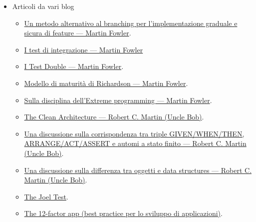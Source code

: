 \documentclass[../norme-di-progetto.tex]{subfiles}
\begin{document}
\begin{itemize}
  \item Articoli da vari blog
        \begin{itemize}
          \item \href{https://martinfowler.com/articles/feature-toggles.html}{Un metodo alternativo al branching per l'implementazione graduale e sicura di feature --- Martin Fowler}.
          \item \href{https://martinfowler.com/bliki/IntegrationTest.html}{I test di integrazione --- Martin Fowler}
          \item\href{https://martinfowler.com/articles/mocksArentStubs.html}{I Test Double --- Martin Fowler}.
          \item \href{https://martinfowler.com/articles/richardsonMaturityModel.html}{Modello di maturità di Richardson --- Martin Fowler}.
          \item \href{https://martinfowler.com/bliki/BeckDesignRules.html}{Sulla disciplina dell'Extreme programming --- Martin Fowler}.
          \item \href{https://blog.cleancoder.com/uncle-bob/2012/08/13/the-clean-architecture.html}{The Clean Architecture --- Robert C. Martin (Uncle Bob)}.
          \item \href{https://blog.cleancoder.com/uncle-bob/2018/06/06/PickledState.html}{Una discussione sulla corrispondenza tra triple GIVEN/WHEN/THEN, ARRANGE/ACT/ASSERT e automi a stato finito --- Robert C. Martin (Uncle Bob)}.
          \item \href{https://blog.cleancoder.com/uncle-bob/2019/06/16/ObjectsAndDataStructures.html}{Una discussione sulla differenza tra oggetti e data structures --- Robert C. Martin (Uncle Bob)}.
          \item \href{https://www.joelonsoftware.com/2000/08/09/the-joel-test-12-steps-to-better-code/}{The Joel Test}.
          \item \href{https://12factor.net/}{The 12-factor app (best practice per lo sviluppo di applicazioni)}.
        \end{itemize}
\end{itemize}

\end{document}
